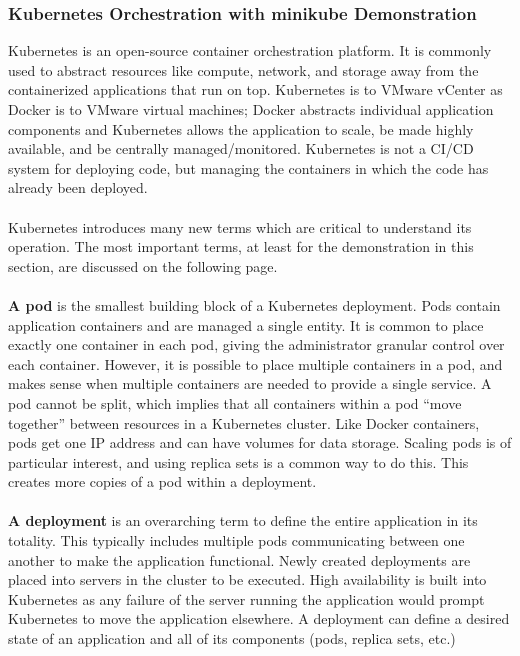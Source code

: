 \subsubsection{Kubernetes Orchestration with minikube Demonstration}
Kubernetes is an open-source container orchestration platform. It is commonly
used to abstract resources like compute, network, and storage away from the
containerized applications that run on top. Kubernetes is to VMware vCenter as
Docker is to VMware virtual machines; Docker abstracts individual application
components and Kubernetes allows the application to scale, be made highly
available, and be centrally managed/monitored. Kubernetes is not a CI/CD
system for deploying code, but managing the containers in which the code has
already been deployed.
\\ \\
Kubernetes introduces many new terms which are critical to understand its
operation. The most important terms, at least for the demonstration in this
section, are discussed on the following page.
\\ \\
\textbf{A pod} is the smallest building block of a Kubernetes deployment. Pods
contain application containers and are managed a single entity. It is common
to place exactly one container in each pod, giving the administrator granular
control over each container. However, it is possible to place multiple
containers in a pod, and makes sense when multiple containers are needed to
provide a single service. A pod cannot be split, which implies that all
containers within a pod ``move together'' between resources in a Kubernetes
cluster. Like Docker containers, pods get one IP address and can have volumes
for data storage. Scaling pods is of particular interest, and using replica
sets is a common way to do this. This creates more copies of a pod within a
deployment.
\\ \\
\textbf{A deployment} is an overarching term to define the entire application
in its totality. This typically includes multiple pods communicating between
one another to make the application functional. Newly created deployments are
placed into servers in the cluster to be executed. High availability is built
into Kubernetes as any failure of the server running the application would
prompt Kubernetes to move the application elsewhere. A deployment can define a
desired state of an application and all of its components (pods, replica sets, etc.)
\\ \\
